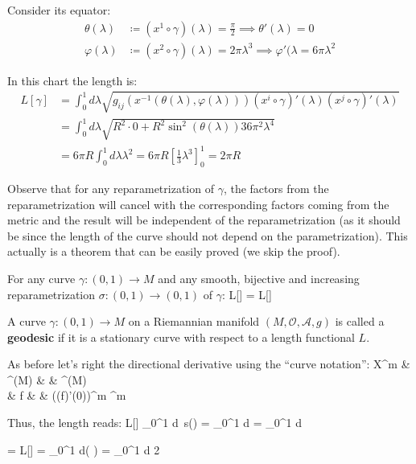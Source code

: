 Consider its equator:
\begin{align*}
\theta(\lambda) & \coloneqq (x^1 \circ \gamma)(\lambda) = \frac{\pi}{2} \implies \theta'(\lambda) = 0 \\
\varphi(\lambda) & \coloneqq (x^2 \circ \gamma)(\lambda) = 2\pi \lambda^3 \implies \varphi'(\lambda = 6\pi\lambda^2
\end{align*}

In this chart the length is:
\begin{align*}
L[\gamma] & = \int_0^1 d\lambda \sqrt{g_{ij}(x^{-1}(\theta(\lambda), \varphi(\lambda)))(x^i \circ \gamma)'
(\lambda)(x^j \circ \gamma)'(\lambda)} \\[5pt]
& = \int_0^1 d\lambda \sqrt{R^2 \cdot 0 + R^2\sin^2{(\theta(\lambda))} 36 \pi^2 \lambda^4} \\[5pt]
& = 6\pi R \int_0^1 d\lambda \lambda^2 = 6\pi R [\frac{1}{3} \lambda^3]^1_0 = 2\pi R
\end{align*}
\ee

Observe that for any reparametrization of $\gamma$, the factors from the reparametrization will cancel with the
corresponding factors coming from the metric and the result will be independent of the reparametrization (as it should
be since the length of the curve should not depend on the parametrization). This actually is a theorem that can be
easily proved (we skip the proof).

\bt[]
For any curve $\gamma : (0,1) \to M$ and any smooth, bijective and increasing reparametrization $\sigma :(0,1) \to
(0,1)$ of $\gamma$:
\bse
L[\gamma] = L[\gamma \circ \sigma]
\ese
\et

\bd [Geodesic]
A curve $\gamma : (0,1) \to M$ on a Riemannian manifold $(M, \mathcal{O}, \mathscr{A}, g)$ is called a
\textbf{geodesic} if it is a stationary curve with respect to a length functional $L$.
\ed

As before let's right the directional derivative using the ``curve notation'':
X^m \cl & ^\infty(M) & \xrightarrow{\sim} & ^\infty(M) \\
& f & \mapsto & ((f\circ\gamma)'(0))^m \coloneqq \dot{\gamma}^m
\ei

Thus, the length reads:
\bse
L[\gamma] \coloneqq \int_0^1 d\lambda \, s(\lambda) = \int_0^1 d\lambda {} =
\int_0^1 d\lambda {}
\ese

= \delta L[\gamma] = \int_0^1 d\lambda \cdot \delta \left(  \right)
= \int_0^1 d\lambda \cdot {}
{2{}}
\ese

